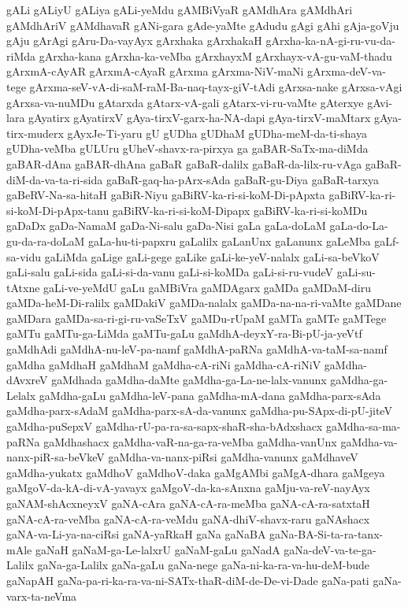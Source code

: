 {gALi
gALiyU
gALiya
gALi-yeMdu
gAMBiVyaR
gAMdhAra
gAMdhAri
gAMdhAriV
gAMdhavaR
gANi-gara
gAde-yaMte
gAdudu
gAgi
gAhi
gAja-goVju
gAju
gArAgi
gAru-Da-vayAyx
gArxhaka
gArxhakaH
gArxha-ka-nA-gi-ru-vu-da-riMda
gArxha-kana
gArxha-ka-veMba
gArxhayxM
gArxhayx-vA-gu-vaM-thadu
gArxmA-cAyAR
gArxmA-cAyaR
gArxma
gArxma-NiV-maNi
gArxma-deV-va-tege
gArxma-seV-vA-di-saM-raM-Ba-naq-tayx-giV-tAdi
gArxsa-nake
gArxsa-vAgi
gArxsa-va-nuMDu
gAtarxda
gAtarx-vA-gali
gAtarx-vi-ru-vaMte
gAterxye
gAvi-lara
gAyatirx
gAyatirxV
gAya-tirxV-garx-ha-NA-dapi
gAya-tirxV-maMtarx
gAya-tirx-muderx
gAyxJe-Ti-yaru
gU
gUDha
gUDhaM
gUDha-meM-da-ti-shaya
gUDha-veMba
gULUru
gUheV-shavx-ra-pirxya
ga
gaBAR-SaTx-ma-diMda
gaBAR-dAna
gaBAR-dhAna
gaBaR
gaBaR-dalilx
gaBaR-da-lilx-ru-vAga
gaBaR-diM-da-va-ta-ri-sida
gaBaR-gaq-ha-pArx-sAda
gaBaR-gu-Diya
gaBaR-tarxya
gaBeRV-Na-sa-hitaH
gaBiR-Niyu
gaBiRV-ka-ri-si-koM-Di-pApxta
gaBiRV-ka-ri-si-koM-Di-pApx-tanu
gaBiRV-ka-ri-si-koM-Dipapx
gaBiRV-ka-ri-si-koMDu
gaDaDx
gaDa-NamaM
gaDa-Ni-salu
gaDa-Nisi
gaLa
gaLa-doLaM
gaLa-do-La-gu-da-ra-doLaM
gaLa-hu-ti-papxru
gaLalilx
gaLanUnx
gaLanunx
gaLeMba
gaLf-sa-vidu
gaLiMda
gaLige
gaLi-gege
gaLike
gaLi-ke-yeV-nalalx
gaLi-sa-beVkoV
gaLi-salu
gaLi-sida
gaLi-si-da-vanu
gaLi-si-koMDa
gaLi-si-ru-vudeV
gaLi-su-tAtxne
gaLi-ve-yeMdU
gaLu
gaMBiVra
gaMDAgarx
gaMDa
gaMDaM-diru
gaMDa-heM-Di-ralilx
gaMDakiV
gaMDa-nalalx
gaMDa-na-na-ri-vaMte
gaMDane
gaMDara
gaMDa-sa-ri-gi-ru-vaSeTxV
gaMDu-rUpaM
gaMTa
gaMTe
gaMTege
gaMTu
gaMTu-ga-LiMda
gaMTu-gaLu
gaMdhA-deyxY-ra-Bi-pU-ja-yeVtf
gaMdhAdi
gaMdhA-nu-leV-pa-namf
gaMdhA-paRNa
gaMdhA-va-taM-sa-namf
gaMdha
gaMdhaH
gaMdhaM
gaMdha-cA-riNi
gaMdha-cA-riNiV
gaMdha-dAvxreV
gaMdhada
gaMdha-daMte
gaMdha-ga-La-ne-lalx-vanunx
gaMdha-ga-Lelalx
gaMdha-gaLu
gaMdha-leV-pana
gaMdha-mA-dana
gaMdha-parx-sAda
gaMdha-parx-sAdaM
gaMdha-parx-sA-da-vanunx
gaMdha-pu-SApx-di-pU-jiteV
gaMdha-puSepxV
gaMdha-rU-pa-ra-sa-sapx-shaR-sha-bAdxshacx
gaMdha-sa-ma-paRNa
gaMdhashacx
gaMdha-vaR-na-ga-ra-veMba
gaMdha-vanUnx
gaMdha-va-nanx-piR-sa-beVkeV
gaMdha-va-nanx-piRsi
gaMdha-vanunx
gaMdhaveV
gaMdha-yukatx
gaMdhoV
gaMdhoV-daka
gaMgAMbi
gaMgA-dhara
gaMgeya
gaMgoV-da-kA-di-vA-yavayx
gaMgoV-da-ka-sAnxna
gaMju-va-reV-nayAyx
gaNAM-shAcxneyxV
gaNA-cAra
gaNA-cA-ra-meMba
gaNA-cA-ra-satxtaH
gaNA-cA-ra-veMba
gaNA-cA-ra-veMdu
gaNA-dhiV-shavx-raru
gaNAshacx
gaNA-va-Li-ya-na-ciRsi
gaNA-yaRkaH
gaNa
gaNaBA
gaNa-BA-Si-ta-ra-tanx-mAle
gaNaH
gaNaM-ga-Le-lalxrU
gaNaM-gaLu
gaNadA
gaNa-deV-va-te-ga-Lalilx
gaNa-ga-Lalilx
gaNa-gaLu
gaNa-nege
gaNa-ni-ka-ra-va-hu-deM-bude
gaNapAH
gaNa-pa-ri-ka-ra-va-ni-SATx-thaR-diM-de-De-vi-Dade
gaNa-pati
gaNa-varx-ta-neVma
}
